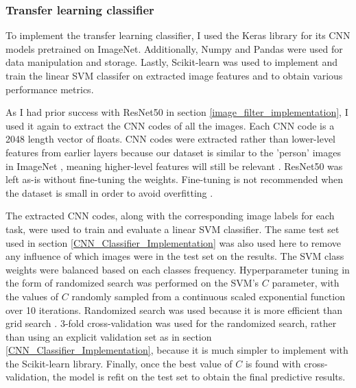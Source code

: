 \documentclass[10pt,twocolumn,letterpaper]{article}
\begin{document}
\subsubsection{Transfer learning classifier}

To implement the transfer learning classifier, I used the Keras \cite{chollet2015keras} library for its CNN models pretrained on ImageNet. Additionally, Numpy \cite{numpy} and Pandas \cite{mckinney-proc-scipy-2010} were used for data manipulation and storage. Lastly, Scikit-learn \cite{scikit-learn} was used to implement and train the linear SVM classifer on extracted image features and to obtain various performance metrics. 

As I had prior success with ResNet50 in section \ref{image_filter_implementation}, I used it again to extract the CNN codes of all the images. Each CNN code is a 2048 length vector of floats. CNN codes were extracted rather than lower-level features from earlier layers because our dataset is similar to the 'person' images in ImageNet \cite{imagenet_cvpr09}, meaning higher-level features will still be relevant \cite{karpathy_2018_transfer}. ResNet50 was left as-is without fine-tuning the weights. Fine-tuning is not recommended when the dataset is small in order to avoid overfitting \cite{karpathy_2018_transfer}.

The extracted CNN codes, along with the corresponding image labels for each task, were used to train and evaluate a linear SVM classifier. The same test set used in section \ref{CNN_Classifier_Implementation} was also used here to remove any influence of which images were in the test set on the results. The SVM class weights were balanced based on each classes frequency. Hyperparameter tuning in the form of randomized search was performed on the SVM's $C$ parameter, with the values of $C$ randomly sampled from a continuous scaled exponential function over 10 iterations. Randomized search was used because it is more efficient than grid search \cite{karpathy_2018_nn3}. 3-fold cross-validation was used for the randomized search, rather than using an explicit validation set as in section \ref{CNN_Classifier_Implementation}, because it is much simpler to implement with the Scikit-learn library. Finally, once the best value of $C$ is found with cross-validation, the model is refit on the test set to obtain the final predictive results.
\end{document}
